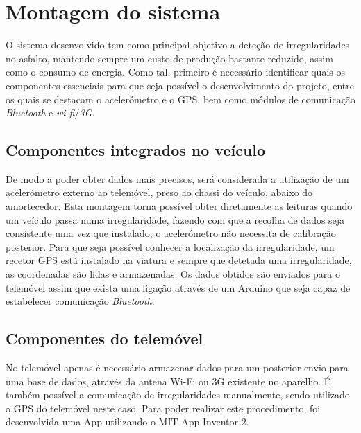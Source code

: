\section{Montagem do sistema}
\label{sec:montagem_do_sistema}

O sistema desenvolvido tem como principal objetivo a deteção de irregularidades no asfalto, mantendo sempre um custo de produção bastante reduzido, assim como o consumo de energia. Como tal, primeiro é necessário identificar quais os componentes essenciais para que seja possível o desenvolvimento do projeto, entre os quais se destacam o acelerómetro e o GPS, bem como módulos de comunicação \emph{Bluetooth} e \emph{wi-fi}/\emph{3G}.

\subsection{Componentes integrados no veículo}
\label{subsec: componentes_montados_no_veiculo}

De modo a poder obter dados mais precisos, será considerada a utilização de um acelerómetro externo ao telemóvel, preso ao chassi do veículo, abaixo do amortecedor.
Esta montagem torna possível obter diretamente as leituras quando um veículo passa numa irregularidade, fazendo com que a recolha de dados seja consistente uma vez que instalado, o acelerómetro não necessita de calibração posterior.
Para que seja possível conhecer a localização da irregularidade, um recetor GPS está instalado na viatura e sempre que detetada uma irregularidade, as coordenadas são lidas e armazenadas.
Os dados obtidos são enviados para o telemóvel assim que exista uma ligação através de um Arduino que seja capaz de estabelecer comunicação \emph{Bluetooth}.

\subsection{Componentes do telemóvel}
\label{subsec: componentes_do_telemovel}

No telemóvel apenas é necessário armazenar dados para um posterior envio para uma base de dados, através da antena Wi-Fi ou 3G existente no aparelho.
É também possível a comunicação de irregularidades manualmente, sendo utilizado o GPS do telemóvel neste caso. Para poder realizar este procedimento, foi desenvolvida uma App utilizando o MIT App Inventor 2.